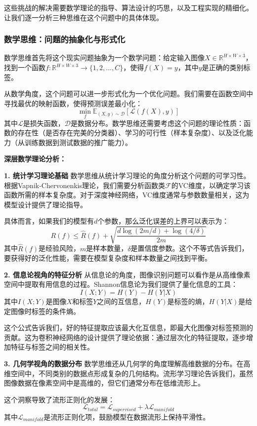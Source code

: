 这些挑战的解决需要数学理论的指导、算法设计的巧思，以及工程实现的精细化。让我们逐一分析三种思维在这个问题中的具体体现。

\subsubsection{数学思维：问题的抽象化与形式化}

数学思维首先将这个现实问题抽象为一个数学问题：给定输入图像$X \in \mathbb{R}^{H \times W \times 3}$，找到一个函数$f: \mathbb{R}^{H \times W \times 3} \rightarrow \{1, 2, ..., C\}$，使得$f(X) = y$，其中$y$是正确的类别标签。

从数学角度，这个问题可以进一步形式化为一个优化问题。我们需要在函数空间中寻找最优的映射函数，使得预测误差最小化：
$$\min_{f} \mathbb{E}_{(X,y) \sim \mathcal{D}}[\mathcal{L}(f(X), y)]$$
其中$\mathcal{L}$是损失函数，$\mathcal{D}$是数据分布。数学思维还需要考虑这个问题的理论性质：函数的存在性（是否存在完美的分类器）、学习的可行性（样本复杂度）、以及泛化能力（从训练数据到测试数据的推广能力）。

\textbf{深层数学理论分析：}

\textbf{1. 统计学习理论基础}
数学思维从统计学习理论的角度分析这个问题的可学习性。根据Vapnik-Chervonenkis理论，我们需要分析函数类$\mathcal{F}$的VC维度，以确定学习该函数所需的样本复杂度。对于深度神经网络，VC维度通常与参数数量相关，这为模型设计提供了理论指导。

具体而言，如果我们的模型有$d$个参数，那么泛化误差的上界可以表示为：
$$R(f) \leq \hat{R}(f) + \sqrt{\frac{d \log(2m/d) + \log(4/\delta)}{2m}}$$
其中$\hat{R}(f)$是经验风险，$m$是样本数量，$\delta$是置信度参数。这个不等式告诉我们，要获得好的泛化性能，需要在模型复杂度和样本数量之间找到平衡。

\textbf{2. 信息论视角的特征分析}
从信息论的角度，图像识别问题可以看作是从高维像素空间中提取有用信息的过程。Shannon信息论为我们提供了量化信息的工具：
$$I(X; Y) = H(Y) - H(Y|X)$$
其中$I(X; Y)$是图像$X$和标签$Y$之间的互信息，$H(Y)$是标签的熵，$H(Y|X)$是给定图像时标签的条件熵。

这个公式告诉我们，好的特征提取应该最大化互信息，即最大化图像对标签预测的贡献。这为卷积神经网络的设计提供了理论依据：通过层次化的特征提取，逐步增加特征与标签之间的相关性。

\textbf{3. 几何学视角的数据分布}
数学思维还从几何学的角度理解高维数据的分布。在高维空间中，不同类别的数据点形成复杂的几何结构。流形学习理论告诉我们，虽然图像数据在像素空间中是高维的，但它们通常分布在低维流形上。

这个洞察导致了流形正则化的发展：
$$\mathcal{L}_{total} = \mathcal{L}_{supervised} + \lambda \mathcal{L}_{manifold}$$
其中$\mathcal{L}_{manifold}$是流形正则化项，鼓励模型在数据流形上保持平滑性。

